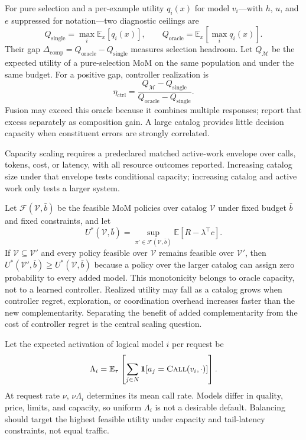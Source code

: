 For pure selection and a per-example utility $q_i(x)$ for model $v_i$---with
$h$, $u$, and $e$ suppressed for notation---two diagnostic ceilings are
\begin{equation}
 Q_{\mathrm{single}}=\max_i\mathbb{E}_{x}[q_i(x)],\qquad
 Q_{\mathrm{oracle}}=\mathbb{E}_{x}\left[\max_i q_i(x)\right].
 \label{eq:oracle}
\end{equation}
Their gap $\Delta_{\mathrm{comp}}=Q_{\mathrm{oracle}}-Q_{\mathrm{single}}$
measures selection headroom. Let $Q_{\mathcal{M}}$ be the expected utility of a
pure-selection MoM on the same population and under the same budget. For a
positive gap, controller realization is
\begin{equation}
 \eta_{\mathrm{ctrl}}=
 \frac{Q_{\mathcal{M}}-Q_{\mathrm{single}}}
      {Q_{\mathrm{oracle}}-Q_{\mathrm{single}}}.
 \label{eq:controller-realization}
\end{equation}
Fusion may exceed this oracle because it combines multiple responses; report
that excess separately as composition gain. A large catalog provides little
decision capacity when constituent errors are strongly correlated.

Capacity scaling requires a predeclared matched active-work envelope over
calls, tokens, cost, or latency, with all resource outcomes reported.
Increasing catalog size under that envelope tests conditional capacity;
increasing catalog and active work only tests a larger system.

Let $\mathcal{F}(\mathcal{V},\bar b)$ be the feasible MoM policies over catalog
$\mathcal{V}$ under fixed budget $\bar b$ and fixed constraints, and let
\begin{equation}
 U^*(\mathcal{V},\bar b)=
 \sup_{\pi'\in\mathcal{F}(\mathcal{V},\bar b)}
 \mathbb{E}[R-\lambda^{\top}c].
 \label{eq:catalog-monotonicity}
\end{equation}
If $\mathcal{V}\subseteq\mathcal{V}'$ and every policy feasible over
$\mathcal{V}$ remains feasible over $\mathcal{V}'$, then
$U^*(\mathcal{V}',\bar b)\geq U^*(\mathcal{V},\bar b)$ because a policy over the larger
catalog can assign zero probability to every added model. This monotonicity
belongs to oracle capacity, not to a learned controller. Realized utility may
fall as a catalog grows when controller regret, exploration, or coordination
overhead increases faster than the new complementarity. Separating the benefit
of added complementarity from the cost of controller regret is the central
scaling question.

Let the expected activation of logical model $i$ per request be
\begin{equation}
 \Lambda_i=\mathbb{E}_{\tau}\left[
   \sum_{j\in N}\mathbf{1}[a_j=\textsc{Call}(v_i,\cdot)]\right].
 \label{eq:model-load}
\end{equation}
At request rate $\nu$, $\nu\Lambda_i$ determines its mean call rate. Models differ
in quality, price, limits, and capacity, so uniform $\Lambda_i$ is not a desirable
default.  Balancing should target the highest feasible utility under capacity
and tail-latency constraints, not equal traffic.

